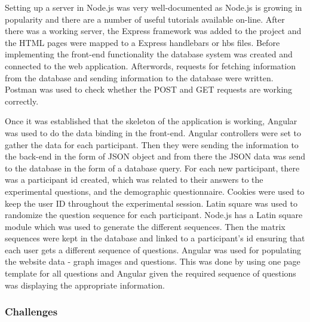 \documentclass{l4proj}
\begin{document}
Setting up a server in Node.js was very well-documented as Node.js is growing in popularity and there are a number of useful tutorials available on-line. After there was a working server, the Express framework was added to the project and the HTML pages were mapped to a Express handlebars or hbs files. Before implementing the front-end functionality the database system was created and connected to the web application. Afterwords, requests for fetching information from the database and sending information to the database were written. Postman was used to check whether the POST and GET requests are working correctly. 

Once it was established that the skeleton of the application is working, Angular was used to do the data binding in the front-end. Angular controllers were set to gather the data for each participant. Then they were sending the information to the back-end in the form of JSON object and from there the JSON data was send to the database in the form of a database query. For each new participant, there was a participant id created, which was related to their answers to the experimental questions, and the demographic questionnaire. Cookies were used to keep the user ID throughout the experimental session. Latin square was used to randomize the question sequence for each participant. Node.js has a Latin square module which was used to generate the different sequences. Then the matrix sequences were kept in the database and linked to a participant's id ensuring that each user gets a different sequence of questions. Angular was used for populating the website data - graph images and questions. This was done by using one page template for all questions and Angular given the required sequence of questions was displaying the appropriate information. 

\subsubsection{Challenges}
\end{document}
